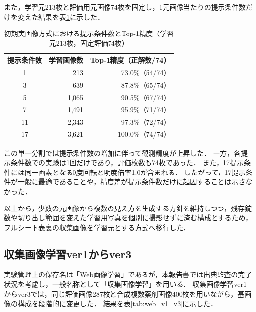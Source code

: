 \documentclass[uplatex,dvipdfmx]{jsarticle}
\begin{document}
また，学習元213枚と評価用元画像74枚を固定し，1元画像当たりの提示条件数だけを変えた結果を表\ref{tab:augmentation_history}に示した．

\begin{table}[H]
  \centering
  \caption{初期実画像方式における提示条件数とTop-1精度（学習元213枚，固定評価74枚）}
  \label{tab:augmentation_history}
  \small
  \begin{tabular}{|c|r|r|}
    \hline
    提示条件数 & 学習画像数 & Top-1精度（正解数/74） \\ \hline
    1 & 213 & 73.0\%（54/74） \\ \hline
    3 & 639 & 87.8\%（65/74） \\ \hline
    5 & 1,065 & 90.5\%（67/74） \\ \hline
    7 & 1,491 & 95.9\%（71/74） \\ \hline
    11 & 2,343 & 97.3\%（72/74） \\ \hline
    17 & 3,621 & 100.0\%（74/74） \\ \hline
  \end{tabular}
\end{table}

この単一分割では提示条件数の増加に伴って観測精度が上昇した．
一方，各提示条件数での実験は1回だけであり，評価枚数も74枚であった．
また，17提示条件には同一画素となる0度回転と明度倍率1.0が含まれる．
したがって，17提示条件が一般に最適であることや，精度差が提示条件数だけに起因することは示さなかった．

以上から，少数の元画像から複数の見え方を生成する方針を維持しつつ，残存錠数や切り出し範囲を変えた学習用写真を個別に撮影せずに済む構成とするため，フルシート表裏の収集画像を学習元とする方式へ移行した．

\subsection{収集画像学習ver1からver3}

実験管理上の保存名は「Web画像学習」であるが，本報告書では出典監査の完了状況を考慮し，一般名称として「収集画像学習」を用いる．
収集画像学習ver1からver3では，同じ評価画像287枚と合成複数薬剤画像400枚を用いながら，基画像の構成を段階的に変更した．
結果を表\ref{tab:web_v1_v3}に示した．
\end{document}
